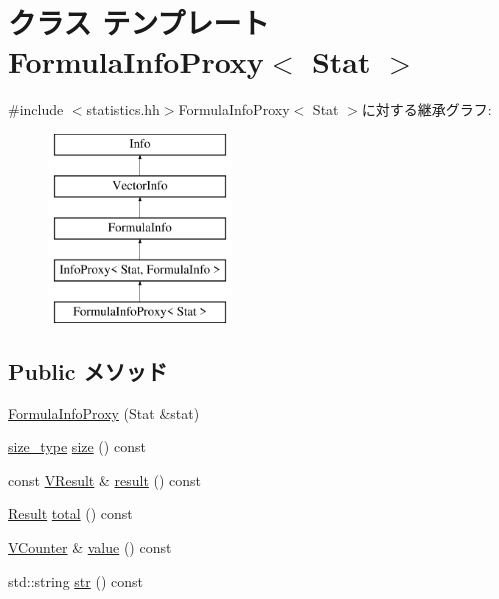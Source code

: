 \hypertarget{classStats_1_1FormulaInfoProxy}{
\section{クラス テンプレート FormulaInfoProxy$<$ Stat $>$}
\label{classStats_1_1FormulaInfoProxy}
}


{\ttfamily \#include $<$statistics.hh$>$}FormulaInfoProxy$<$ Stat $>$に対する継承グラフ:\begin{figure}[H]
\begin{center}
\leavevmode
\includegraphics[height=5cm]{classStats_1_1FormulaInfoProxy}
\end{center}
\end{figure}
\subsection*{Public メソッド}
\begin{DoxyCompactItemize}
\item 
\hyperlink{classStats_1_1FormulaInfoProxy_a94b5db43f2f6beda2d44a36aa20ad368}{FormulaInfoProxy} (Stat \&stat)
\item 
\hyperlink{namespaceStats_ada51e68d31936547d3729c82daf6b7c6}{size\_\-type} \hyperlink{classStats_1_1FormulaInfoProxy_a503ab01f6c0142145d3434f6924714e7}{size} () const 
\item 
const \hyperlink{classstd_1_1vector}{VResult} \& \hyperlink{classStats_1_1FormulaInfoProxy_aba312f9e3431b1652f8b3ddf3fe105dc}{result} () const 
\item 
\hyperlink{namespaceStats_ad874d2cfd4b4a29ebd480bb2e67f20ae}{Result} \hyperlink{classStats_1_1FormulaInfoProxy_a35c6e2ed3fc81b40d69052a062113ead}{total} () const 
\item 
\hyperlink{classstd_1_1vector}{VCounter} \& \hyperlink{classStats_1_1FormulaInfoProxy_a1840628d1aea3c4fe5cf3ae375850a4a}{value} () const 
\item 
std::string \hyperlink{classStats_1_1FormulaInfoProxy_a1b9b8885b0880fc4ddf9a2c7d1ca3dc4}{str} () const 
\end{DoxyCompactItemize}
